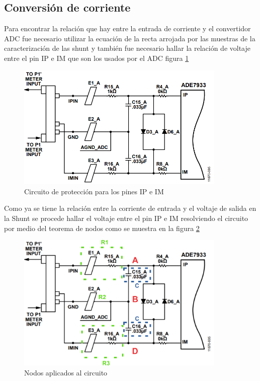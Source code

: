 \subsection{Conversión de corriente}
Para encontrar la relación que hay entre la entrada de corriente y el convertidor ADC fue necesario utilizar la ecuación de la recta arrojada por las muestras de la caracterización de las shunt y también fue necesario hallar la relación de voltaje entre el pin IP e IM que son los usados por el ADC figura \ref{fig:CircuitoCorriente}


\begin{figure}[H]
    \begin{center}
        \includegraphics[width = 10cm]{3Proyecto/CircuitoCorriente.PNG}
    \caption{ Circuito de protección para los pines IP e IM } 
    \label{fig:CircuitoCorriente}
   \end{center}
\end{figure}

Como ya se tiene la relación entre la corriente de entrada y el voltaje de salida en la Shunt se procede hallar el voltaje entre el pin IP e IM resolviendo el circuito por medio del teorema de nodos como se muestra en la figura \ref{fig:Nodos}
\begin{figure}[H]
    \begin{center}
        \includegraphics[width = 10cm]{3Proyecto/Nodos.PNG}
    \caption{ Nodos aplicados al circuito} 
    \label{fig:Nodos}
   \end{center}
\end{figure}

